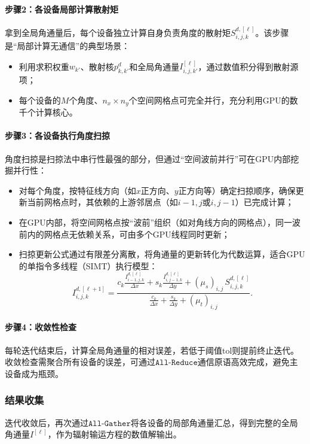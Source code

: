 \paragraph{步骤2：各设备局部计算散射矩}
拿到全局角通量后，每个设备独立计算自身负责角度的散射矩$S^{d,[\ell]}_{i,j,k}$。该步骤是“局部计算无通信”的典型场景：
\begin{itemize}
    \item 利用求积权重$w_{k'}$、散射核$p^d_{k,k'}$和全局角通量$I^{[\ell]}_{i,j,k'}$，通过数值积分得到散射源项；
    \item 每个设备的$M$个角度、$n_x \times n_y$个空间网格点可完全并行，充分利用GPU的数千个计算核心。
\end{itemize}

\paragraph{步骤3：各设备执行角度扫掠}
角度扫掠是扫掠法中串行性最强的部分，但通过“空间波前并行”可在GPU内部挖掘并行性：
\begin{itemize}
    \item 对每个角度，按特征线方向（如$x$正方向、$y$正方向等）确定扫掠顺序，确保更新当前网格点时，其依赖的上游邻居点（如$i-1,j$或$i,j-1$）已完成计算；
    \item 在GPU内部，将空间网格点按“波前”组织（如对角线方向的网格点），同一波前内的网格点无依赖关系，可由多个GPU线程同时更新；
    \item 扫掠更新公式通过有限差分离散，将角通量的更新转化为代数运算，适合GPU的单指令多线程（SIMT）执行模型：
          \[
              I^{d,[\ell+1]}_{i,j,k} = \frac{c_k\frac{I^{d,[\ell]}_{i-1,j,k}}{\Delta x} + s_k\frac{I^{d,[\ell]}_{i,j-1,k}}{\Delta y} + (\mu_s)_{i,j}\,S^{d,[\ell]}_{i,j,k}}{\frac{c_k}{\Delta x} + \frac{s_k}{\Delta y} + (\mu_t)_{i,j}}.
          \]
\end{itemize}

\paragraph{步骤4：收敛性检查}
每轮迭代结束后，计算全局角通量的相对误差，若低于阈值$\text{tol}$则提前终止迭代。收敛检查需聚合所有设备的误差，可通过$\texttt{All-Reduce}$通信原语高效完成，避免主设备成为瓶颈。

\subsubsection{结果收集}
迭代收敛后，再次通过$\texttt{All-Gather}$将各设备的局部角通量汇总，得到完整的全局角通量$I^{[\ell]}$，作为辐射输运方程的数值解输出。

